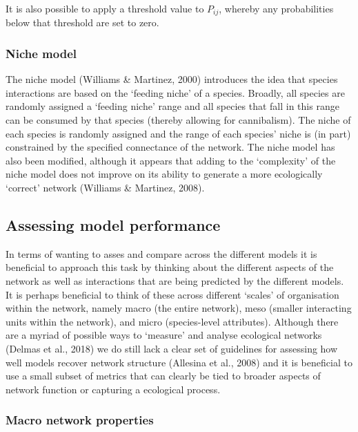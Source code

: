 \documentclass[
]{article}
\begin{document}
It is also possible to apply a threshold value to \(P_{ij}\), whereby
any probabilities below that threshold are set to zero.

\subsubsection{Niche model}\label{niche-model}

The niche model (Williams \& Martinez, 2000) introduces the idea that
species interactions are based on the `feeding niche' of a species.
Broadly, all species are randomly assigned a `feeding niche' range and
all species that fall in this range can be consumed by that species
(thereby allowing for cannibalism). The niche of each species is
randomly assigned and the range of each species' niche is (in part)
constrained by the specified connectance of the network. The niche model
has also been modified, although it appears that adding to the
`complexity' of the niche model does not improve on its ability to
generate a more ecologically `correct' network (Williams \& Martinez,
2008).

\subsection{Assessing model
performance}\label{assessing-model-performance}

In terms of wanting to asses and compare across the different models it
is beneficial to approach this task by thinking about the different
aspects of the network as well as interactions that are being predicted
by the different models. It is perhaps beneficial to think of these
across different `scales' of organisation within the network, namely
macro (the entire network), meso (smaller interacting units within the
network), and micro (species-level attributes). Although there are a
myriad of possible ways to `measure' and analyse ecological networks
(Delmas et al., 2018) we do still lack a clear set of guidelines for
assessing how well models recover network structure (Allesina et al.,
2008) and it is beneficial to use a small subset of metrics that can
clearly be tied to broader aspects of network function or capturing a
ecological process.

\subsubsection{Macro network properties}\label{macro-network-properties}
\end{document}
